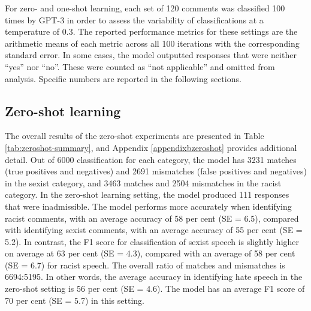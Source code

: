 \documentclass[12pt,]{article}
\begin{document}
For zero- and one-shot learning, each set of 120 comments was classified 100 times by GPT-3 in order to assess the variability of classifications at a temperature of 0.3. The reported performance metrics for these settings are the arithmetic means of each metric across all 100 iterations with the corresponding standard error. In some cases, the model outputted responses that were neither ``yes'' nor ``no''. These were counted as ``not applicable'' and omitted from analysis. Specific numbers are reported in the following sections.

\hypertarget{zero-shot-learning-1}{%
\subsection{Zero-shot learning}\label{zero-shot-learning-1}}

The overall results of the zero-shot experiments are presented in Table \ref{tab:zeroshot-summary}, and Appendix \ref{appendixbzeroshot} provides additional detail. Out of 6000 classification for each category, the model has 3231 matches (true positives and negatives) and 2691 mismatches (false positives and negatives) in the sexist category, and 3463 matches and 2504 mismatches in the racist category. In the zero-shot learning setting, the model produced 111 responses that were inadmissible. The model performs more accurately when identifying racist comments, with an average accuracy of 58 per cent (SE = 6.5), compared with identifying sexist comments, with an average accuracy of 55 per cent (SE = 5.2). In contrast, the F1 score for classification of sexist speech is slightly higher on average at 63 per cent (SE = 4.3), compared with an average of 58 per cent (SE = 6.7) for racist speech. The overall ratio of matches and mismatches is 6694:5195. In other words, the average accuracy in identifying hate speech in the zero-shot setting is 56 per cent (SE = 4.6). The model has an average F1 score of 70 per cent (SE = 5.7) in this setting.
\end{document}
